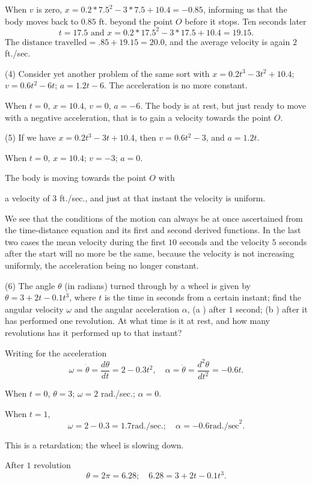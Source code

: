 \documentclass{ximera}
\begin{document}
When $v$ is zero, $x = 0.2 * 7.5^2 - 3 * 7.5 + 10.4 = -0.85$,
informing us that the body moves back to $0.85$ ft.
beyond the point $O$ before it stops. Ten seconds later
\[
t = 17.5 \text{ and } x = 0.2 * 17.5^2 - 3 * 17.5 + 10.4 = 19.15.
\]
$\text{The distance travelled} = .85 + 19.15 = 20.0$, and the
average velocity is again $2$ ft./sec.

(4) Consider yet another problem of the same sort
with $x = 0.2t^3 - 3t^2 + 10.4$; $v = 0.6t^2 - 6t$; $a = 1.2t - 6$.
The acceleration is no more constant.

When $t = 0$, $x = 10.4$, $v = 0$, $a = -6$. The body is
at rest, but just ready to move with a negative
acceleration, that is to gain a velocity towards the
point $O$.

(5) If we have $x = 0.2t^3 - 3t + 10.4$, then $v = 0.6t^2 - 3$,
and $a = 1.2t$.

When $t = 0$, $x = 10.4$; $v = -3$; $a = 0$.

The body is moving towards the point $O$ with

a velocity of $3$ ft./sec., and just at that instant the
velocity is uniform.

We see that the conditions of the motion can always
be at once ascertained from the time-distance equation
and its first and second derived functions. In the
last two cases the mean velocity during the first
$10$ seconds and the velocity $5$ seconds after the start
will no more be the same, because the velocity is not
increasing uniformly, the acceleration being no longer
constant.

(6) The angle $\theta$ (in radians) turned through by a
wheel is given by $\theta = 3 + 2t - 0.1t^3$, where $t$ is the
time in seconds from a certain instant; find the
angular velocity $\omega$ and the angular acceleration $\alpha$,
(a ) after $1$ second; (b ) after it has performed one
revolution. At what time is it at rest, and how many
revolutions has it performed up to that instant?

Writing for the acceleration
\[
\omega =  \dot{\theta} = \dfrac{d\theta}{dt} = 2 - 0.3t^2,\quad
\alpha = \ddot{\theta} = \dfrac{d^2\theta}{dt^2} = -0.6t.
\]

When $t = 0$, $\theta = 3$; $\omega = 2$ rad./sec.; $\alpha = 0$.

When $t = 1$,
\[
\omega = 2 - 0.3 = 1.7 \text{rad./sec.};\quad \alpha = -0.6 \text{rad./sec}^2.
\]

This is a retardation; the wheel is slowing down.

After $1$ revolution
\[
\theta = 2\pi = 6.28;\quad 6.28 = 3 + 2t - 0.1t^3.
\]
\end{document}

